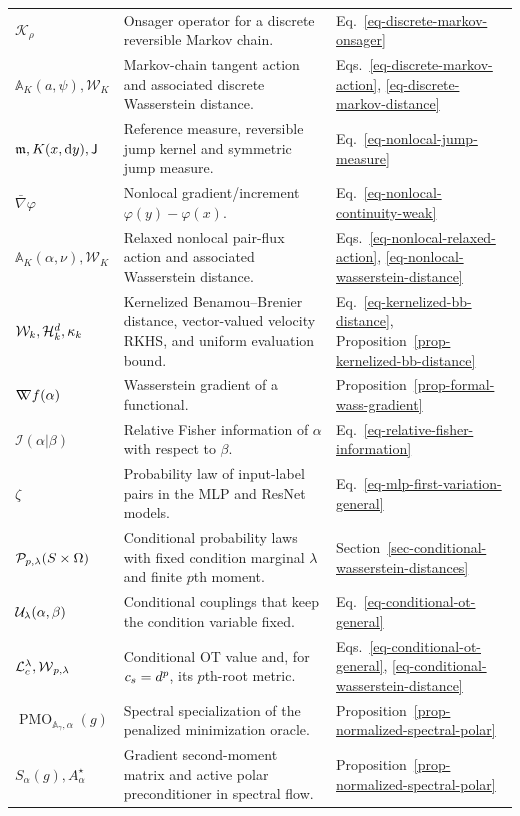 {\begin{longtable}{>{\raggedright\arraybackslash}p{}
                  >{\raggedright\arraybackslash}p{}
                  >{\raggedright\arraybackslash}p{}}
$\mathcal K_\rho$ & Onsager operator for a discrete reversible Markov chain. & Eq.~\eqref{eq-discrete-markov-onsager} \\
$\mathbb A_K(a,\psi),\mathcal W_K$ & Markov-chain tangent action and associated discrete Wasserstein distance. & Eqs.~\eqref{eq-discrete-markov-action}, \eqref{eq-discrete-markov-distance} \\
$\mathfrak m,K(x,\mathrm{d} y),\mathsf J$ & Reference measure, reversible jump kernel and symmetric jump measure. & Eq.~\eqref{eq-nonlocal-jump-measure} \\
$\bar\nabla\varphi$ & Nonlocal gradient/increment $\varphi(y)-\varphi(x)$. & Eq.~\eqref{eq-nonlocal-continuity-weak} \\
$\mathbb A_K(\alpha,\nu),\mathcal W_K$ & Relaxed nonlocal pair-flux action and associated Wasserstein distance. & Eqs.~\eqref{eq-nonlocal-relaxed-action}, \eqref{eq-nonlocal-wasserstein-distance} \\
$\mathcal W_k,\mathcal{H}_k^d,\kappa_k$ & Kernelized Benamou--Brenier distance, vector-valued velocity RKHS, and uniform evaluation bound. & Eq.~\eqref{eq-kernelized-bb-distance}, Proposition~\ref{prop-kernelized-bb-distance} \\
$\mathord{\nabla\mkern-9.3mu\nabla} f(\alpha)$ & Wasserstein gradient of a functional. & Proposition~\ref{prop-formal-wass-gradient} \\
$\mathcal I(\alpha|\beta)$ & Relative Fisher information of $\alpha$ with respect to $\beta$. & Eq.~\eqref{eq-relative-fisher-information} \\
$\zeta$ & Probability law of input-label pairs in the MLP and ResNet models. & Eq.~\eqref{eq-mlp-first-variation-general} \\
$\mathcal{P}_{p,\lambda}(S\times\Omega)$ & Conditional probability laws with fixed condition marginal $\lambda$ and finite $p$th moment. & Section~\ref{sec-conditional-wasserstein-distances} \\
$\mathcal{U}_\lambda(\alpha,\beta)$ & Conditional couplings that keep the condition variable fixed. & Eq.~\eqref{eq-conditional-ot-general} \\
$\mathcal{L}_c^\lambda,\operatorname{\mathcal{W}}_{p,\lambda}$ & Conditional OT value and, for $c_s=d^p$, its $p$th-root metric. & Eqs.~\eqref{eq-conditional-ot-general}, \eqref{eq-conditional-wasserstein-distance} \\
$\operatorname{PMO}_{\mathbb A_\gamma,\alpha}(g)$ & Spectral specialization of the penalized minimization oracle. & Proposition~\ref{prop-normalized-spectral-polar} \\
$S_\alpha(g),A_\alpha^\star$ & Gradient second-moment matrix and active polar preconditioner in spectral flow. & Proposition~\ref{prop-normalized-spectral-polar} \\

\end{longtable}}
